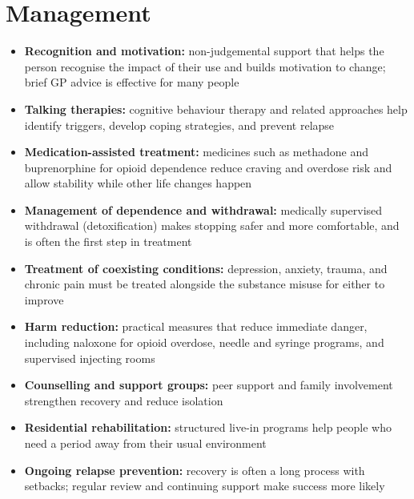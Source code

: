 \section*{Management}
\begin{itemize}
    \item \textbf{Recognition and motivation:} non-judgemental support that helps the person recognise the impact of their use and builds motivation to change; brief GP advice is effective for many people
    \item \textbf{Talking therapies:} cognitive behaviour therapy and related approaches help identify triggers, develop coping strategies, and prevent relapse
    \item \textbf{Medication-assisted treatment:} medicines such as methadone and buprenorphine for opioid dependence reduce craving and overdose risk and allow stability while other life changes happen
    \item \textbf{Management of dependence and withdrawal:} medically supervised withdrawal (detoxification) makes stopping safer and more comfortable, and is often the first step in treatment
    \item \textbf{Treatment of coexisting conditions:} depression, anxiety, trauma, and chronic pain must be treated alongside the substance misuse for either to improve
    \item \textbf{Harm reduction:} practical measures that reduce immediate danger, including naloxone for opioid overdose, needle and syringe programs, and supervised injecting rooms
    \item \textbf{Counselling and support groups:} peer support and family involvement strengthen recovery and reduce isolation
    \item \textbf{Residential rehabilitation:} structured live-in programs help people who need a period away from their usual environment
    \item \textbf{Ongoing relapse prevention:} recovery is often a long process with setbacks; regular review and continuing support make success more likely
\end{itemize}

